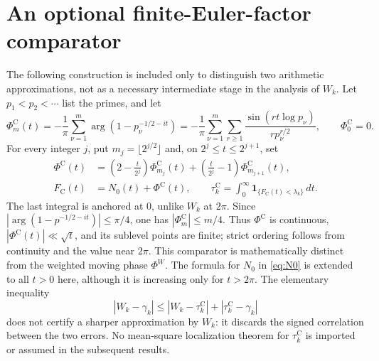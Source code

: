 \documentclass[11pt,leqno]{amsart}
\numberwithin{equation}{section}
\theoremstyle{definition}
\theoremstyle{remark}
\newcommand{\1}{\mathbf 1}
\newcommand{\floor}[1]{\lfloor #1\rfloor}
\begin{document}
\section{An optional finite-Euler-factor comparator}\label{sec:comparison}
The following construction is included only to distinguish two arithmetic approximations, not as a necessary intermediate stage in the analysis of $W_k$. Let $p_1<p_2<\cdots$ list the primes, and let
\begin{equation}\label{eq:Euler-compare}
 \Phi_m^{\mathrm C}(t)=-\frac1\pi\sum_{\nu=1}^m\arg(1-p_\nu^{-1/2-it})
 =-\frac1\pi\sum_{\nu=1}^m\sum_{r\ge1}\frac{\sin(rt\log p_\nu)}{r p_\nu^{r/2}},\qquad\Phi_0^{\mathrm C}=0.
\end{equation}
For every integer $j$, put $m_j=\floor{2^{j/2}}$ and, on $2^j\le t\le2^{j+1}$, set
\begin{align}
 \Phi^{\mathrm C}(t)&=\left(2-\frac t{2^j}\right)\Phi_{m_j}^{\mathrm C}(t)
 +\left(\frac t{2^j}-1\right)\Phi_{m_{j+1}}^{\mathrm C}(t),\label{eq:PhiC}\\
 F_{\mathrm C}(t)&=N_0(t)+\Phi^{\mathrm C}(t),\qquad
 \tau_k^{\mathrm C}=\int_0^\infty\1_{\{F_{\mathrm C}(t)<\lambda_k\}}\,dt.\label{eq:tauc}
\end{align}
The last integral is anchored at $0$, unlike $W_k$ at $2\pi$. Since $|\arg(1-p^{-1/2-it})|\le\pi/4$, one has $|\Phi_m^{\mathrm C}|\le m/4$. Thus $\Phi^{\mathrm C}$ is continuous, $|\Phi^{\mathrm C}(t)|\ll\sqrt t$, and its sublevel points are finite; strict ordering follows from continuity and the value near $2\pi$. This comparator is mathematically distinct from the weighted moving phase $\Phi^W$. The formula for $N_0$ in \eqref{eq:N0} is extended to all $t>0$ here, although it is increasing only for $t>2\pi$. The elementary inequality
\begin{equation}\label{eq:nonhelpful-triangle}
 |W_k-\gamma_k|\le |W_k-\tau_k^{\mathrm C}|+|\tau_k^{\mathrm C}-\gamma_k|
\end{equation}
does not certify a sharper approximation by $W_k$: it discards the signed correlation between the two errors. No mean-square localization theorem for $\tau_k^{\mathrm C}$ is imported or assumed in the subsequent results.
\end{document}
